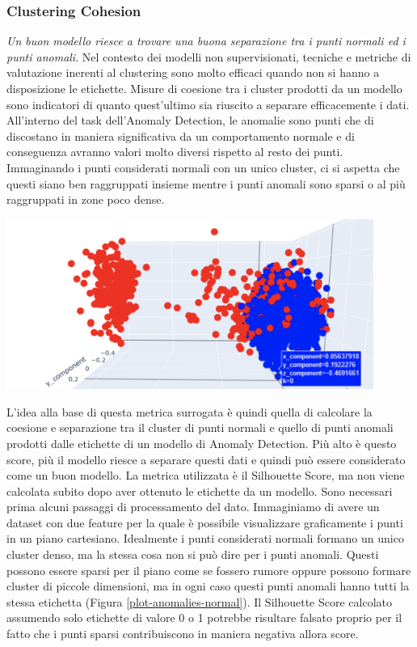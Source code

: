\subsubsection{Clustering Cohesion}
\textit{Un buon modello riesce a trovare una buona separazione tra i punti normali ed i punti anomali}.
Nel contesto dei modelli non supervisionati, tecniche e metriche di valutazione inerenti al clustering sono molto efficaci quando non si hanno a disposizione le etichette. Misure di coesione tra i cluster prodotti da un modello sono indicatori di quanto quest'ultimo sia riuscito a separare efficacemente i dati.
All'interno del task dell'Anomaly Detection, le anomalie sono punti che di discostano in maniera significativa da un comportamento normale e di conseguenza avranno valori molto diversi rispetto al resto dei punti. Immaginando i punti considerati normali con un unico cluster, ci si aspetta che questi siano ben raggruppati insieme mentre i punti anomali sono sparsi o al più raggruppati in zone poco dense.
\begin{center}
	\includegraphics[width=12cm, scale=1]{images/plot-anomalies-normal}
    \captionsetup{type=figure}
    \label{plot-anomalies-normal}
\end{center}
L'idea alla base di questa metrica surrogata è quindi quella di calcolare la coesione e separazione tra il cluster di punti normali e quello di punti anomali prodotti dalle etichette di un modello di Anomaly Detection. Più alto è questo score, più il modello riesce a separare questi dati e quindi può essere considerato come un buon modello.
La metrica utilizzata è il Silhouette Score, ma non viene calcolata subito dopo aver ottenuto le etichette da un modello. Sono necessari prima alcuni passaggi di processamento del dato.
Immaginiamo di avere un dataset con due feature per la quale è possibile visualizzare graficamente i punti in un piano cartesiano. Idealmente i punti considerati normali formano un unico cluster denso, ma la stessa cosa non si può dire per i punti anomali. 
Questi possono essere sparsi per il piano come se fossero rumore oppure possono formare cluster di piccole dimensioni, ma in ogni caso questi punti anomali hanno tutti la stessa etichetta (Figura \ref{plot-anomalies-normal}).
Il Silhouette Score calcolato assumendo solo etichette di valore 0 o 1 potrebbe risultare falsato proprio per il fatto che i punti sparsi contribuiscono in maniera negativa allora score.

